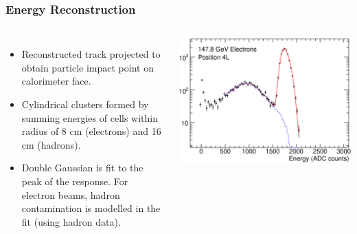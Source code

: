\documentclass[10pt]{beamer}
\begin{document}
\begin{frame}\frametitle{Energy Reconstruction}
\begin{columns}
\begin{itemize}
\item Reconstructed track projected to obtain particle impact point on calorimeter face.
\item Cylindrical clusters formed by summing energies of cells within radius of 8 cm (electrons) and 16 cm (hadrons).
\item Double Gaussian is fit to the peak of the response. For electron beams, hadron contamination is modelled in the fit (using hadron data). 
\end{itemize}
\includegraphics[width=1.0\linewidth,angle=0]{FCalTB_plots/Response_individual_data/Electron_response_148GeV_4L_data.eps}%
\end{columns}
\end{frame}

\end{document}
